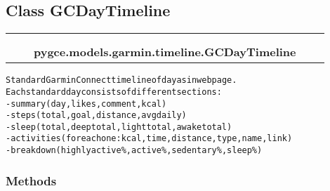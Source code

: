 \subsection{Class GCDayTimeline}

    \label{pygce:models:garmin:timeline:GCDayTimeline}
\begin{tabular}{cccccc}
\multicolumn{2}{r}{\settowidth{\BCL}{object}\multirow{2}{\BCL}{object}}
&&
  \\\cline{3-3}
  &&\multicolumn{1}{c|}{}
&&
  \\
&&\multicolumn{2}{l}{\textbf{pygce.models.garmin.timeline.GCDayTimeline}}
\end{tabular}

\begin{alltt}

Standard Garmin Connect timeline of day as in webpage.
Each standard day consists of different sections:
- summary (day, likes, comment, kcal)
- steps (total, goal, distance, avg daily)
- sleep (total, deep total, light total, awake total)
- activities (for each one: kcal, time, distance, type, name, link)
- breakdown (highly active \%, active \%, sedentary \%, sleep \%)
\end{alltt}



  \subsubsection{Methods}

    \vspace{0.5ex}

